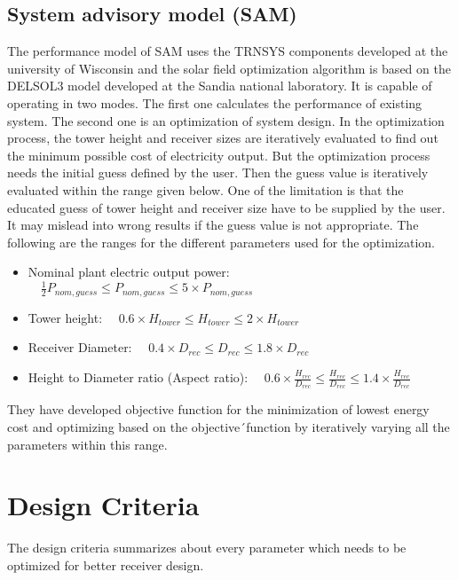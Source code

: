 \subsection{System advisory model (SAM)}
The performance model of SAM uses the TRNSYS components developed at the university of Wisconsin and the solar field optimization algorithm is based on the DELSOL3 model developed at the Sandia national laboratory. It is capable of operating in two modes. The first one calculates the performance of existing system. The second one is an optimization of system design. In the optimization process, the tower height and receiver sizes are iteratively evaluated to find out the minimum possible cost of electricity output. But the optimization process needs the initial guess defined by the user. Then the guess value is iteratively evaluated within the range given below. One of the limitation is that the educated guess of tower height and receiver size have to be supplied by the user. It may mislead into wrong results if the guess value is not appropriate. The following are the ranges for the different parameters used for the optimization.
\begin{itemize}
	\item Nominal plant electric output power: $ \quad  \frac{1}{2}P_{nom,guess}\le P_{nom,guess} \le 5 \times P_{nom,guess} $
	\item Tower height: $ \quad  0.6 \times H_{tower} \le H_{tower} \le 2 \times H_{tower} $
	\item Receiver Diameter: $ \quad  0.4 \times D_{rec}\le D_{rec} \le 1.8 \times D_{rec} $
	\item Height to Diameter ratio (Aspect ratio): $ \quad 0.6 \times \frac{H_{rec}}{D_{rec}}\le \frac{H_{rec}}{D_{rec}} \le 1.4 \times \frac{H_{rec}}{D_{rec}} $ 
\end{itemize}
They have developed objective function for the minimization of lowest energy cost and optimizing based on the objective´function by iteratively varying all the parameters within this range.

\section{Design Criteria}
The design criteria summarizes about every parameter which needs to be optimized for better receiver design.
